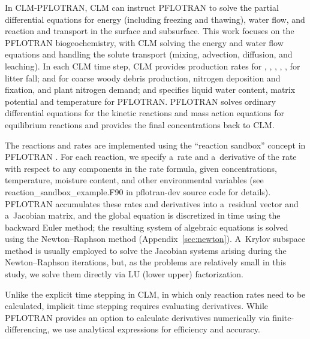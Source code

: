 \documentclass[gmdd, online, hvmath]{copernicus}
\begin{document}
      In CLM-PFLOTRAN, CLM can instruct PFLOTRAN to solve the partial
      differential equations for energy (including freezing and thawing),
      water flow, and reaction and transport in the surface and
      subsurface. This work focuses on the PFLOTRAN biogeochemistry, with
      CLM solving the energy and water flow equations and handling the
      solute transport (mixing, advection, diffusion, and leaching). In each
      CLM time step, CLM provides production rates for ,
      , , , , 
      for litter fall;  and  for coarse woody debris
      production, nitrogen deposition and fixation, and plant nitrogen
      demand; and specifies liquid water content, matrix potential and
      temperature for PFLOTRAN. PFLOTRAN solves ordinary differential
      equations for the kinetic reactions and mass action equations for
      equilibrium reactions and provides the final concentrations back to
      CLM.

      The reactions and rates are implemented using the ``reaction sandbox''
      concept in PFLOTRAN \citep{Lichtner2015}. For each reaction, we
      specify a~rate and a~derivative of the rate with respect to any
      components in the rate formula, given concentrations, temperature,
      moisture content, and other environmental variables (see
      reaction\_sandbox\_example.F90 in pflotran-dev source code for
      details). PFLOTRAN accumulates these rates and derivatives into
      a~residual vector and a~Jacobian matrix, and the global equation is
      discretized in time using the backward Euler method; the resulting
      system of algebraic equations is solved using the Newton--Raphson
      method (Appendix~\ref{sec:newton}).  A~Krylov subspace method is
      usually employed to solve the Jacobian systems arising during the
      Newton--Raphson iterations, but, as the problems are relatively small
      in this study, we solve them directly via LU (lower upper)
      factorization.

      Unlike the explicit time stepping in CLM, in which only reaction rates
      need to be calculated, implicit time stepping requires evaluating
      derivatives.  While PFLOTRAN provides an option to calculate
      derivatives numerically via finite-differencing, we use analytical
      expressions for efficiency and accuracy.
\end{document}
